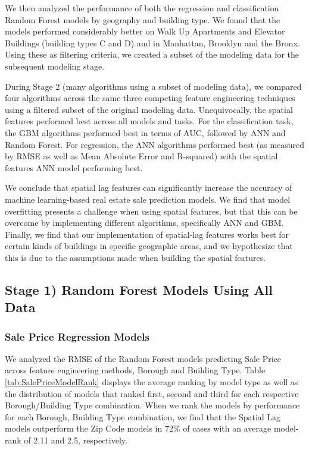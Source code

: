 \documentclass[12pt,]{article}
\begin{document}
We then analyzed the performance of both the regression and
classification Random Forest models by geography and building type. We
found that the models performed considerably better on Walk Up
Apartments and Elevator Buildings (building types C and D) and in
Manhattan, Brooklyn and the Bronx. Using these as filtering criteria, we
created a subset of the modeling data for the subsequent modeling stage.

During Stage 2 (many algorithms using a subset of modeling data), we
compared four algorithms across the same three competing feature
engineering techniques using a filtered subset of the original modeling
data. Unequivocally, the spatial features performed best across all
models and tasks. For the classification task, the GBM algorithms
performed best in terms of AUC, followed by ANN and Random Forest. For
regression, the ANN algorithms performed best (as measured by RMSE as
well as Mean Absolute Error and R-squared) with the spatial features ANN
model performing best.

We conclude that spatial lag features can significantly increase the
accuracy of machine learning-based real estate sale prediction models.
We find that model overfitting presents a challenge when using spatial
features, but that this can be overcome by implementing different
algorithms, specifically ANN and GBM. Finally, we find that our
implementation of spatial-lag features works best for certain kinds of
buildings in specific geographic areas, and we hypothesize that this is
due to the assumptions made when building the spatial features.

\hypertarget{stage-1-random-forest-models-using-all-data}{%
\subsection{Stage 1) Random Forest Models Using All
Data}\label{stage-1-random-forest-models-using-all-data}}

\hypertarget{sale-price-regression-models}{%
\subsubsection{Sale Price Regression
Models}\label{sale-price-regression-models}}

We analyzed the RMSE of the Random Forest models predicting Sale Price
across feature engineering methods, Borough and Building Type. Table
\ref{tab:SalePriceModelRank} displays the average ranking by model type
as well as the distribution of models that ranked first, second and
third for each respective Borough/Building Type combination. When we
rank the models by performance for each Borough, Building Type
combination, we find that the Spatial Lag models outperform the Zip Code
models in 72\% of cases with an average model-rank of 2.11 and 2.5,
respectively.
\end{document}
